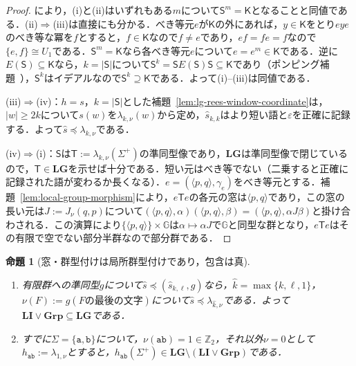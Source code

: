 \documentclass[11pt,a4paper]{ltjsarticle}
\numberwithin{equation}{section}
\theoremstyle{plain}
\newtheorem{proposition}[theorem]{命題}
\theoremstyle{definition}
\theoremstyle{remark}
\newcommand{\eps}{\varepsilon}
\begin{document}
\begin{proof}
\cite[Proposition~2.3, items (1), (3) and (4)]{AlmeidaEtAl2009}により，(i)と(ii)はいずれもある$m$について$\mathsf S^m=\mathsf K$となることと同値である．(ii)$\Rightarrow$(iii)は直接にも分かる．べき等元$e$が$\mathsf K$の外にあれば，$y\in\mathsf K$をとり$eye$のべき等な冪を$f$とすると，$f\in\mathsf K$なので$f\ne e$であり，$ef=fe=f$なので$\{e,f\}\cong U_1$である．$\mathsf S^m=\mathsf K$なら各べき等元$e$について$e=e^m\in\mathsf K$である．逆に$E(\mathsf S)\subseteq\mathsf K$なら，$k=|\mathsf S|$について$\mathsf S^k=\mathsf S E(\mathsf S)\mathsf S\subseteq\mathsf K$であり（ポンピング補題~\cite[Lemma~2.2]{AlmeidaEtAl2009}），$\mathsf S^k$はイデアルなので$\mathsf S^k\supseteq\mathsf K$である．よって(i)--(iii)は同値である．

(iii)$\Rightarrow$(iv)：$h=s$，$k=|\mathsf S|$とした補題~\ref{lem:lg-rees-window-coordinate}は，$|w|\ge2k$について$s(w)$を$\lambda_{k,\nu}(w)$から定め，$\widehat s_{k,k}$はより短い語と$\eps$を正確に記録する．よって$\widehat s\preceq\lambda_{k,\nu}$である．

(iv)$\Rightarrow$(i)：$\mathsf S$は$\mathsf T:=\lambda_{k,\nu}(\Sigma^+)$の準同型像であり，$\mathbf{LG}$は準同型像で閉じているので，$\mathsf T\in\mathbf{LG}$を示せば十分である．短い元はべき等でない（二乗すると正確に記録された語が変わるか長くなる）．$e=(\langle p,q\rangle,\gamma_e)$をべき等元とする．補題~\ref{lem:local-group-morphism}により，$e\mathsf Te$の各元の窓は$\langle p,q\rangle$であり，この窓の長い元は$J:=J_\nu(q,p)$について$(\langle p,q\rangle,\alpha)(\langle p,q\rangle,\beta)=(\langle p,q\rangle,\alpha J\beta)$と掛け合わされる．この演算により$\{\langle p,q\rangle\}\times {\mathbb G}$は$\alpha\mapsto\alpha J$で${\mathbb G}$と同型な群となり，$e\mathsf Te$はその有限で空でない部分半群なので部分群である．
\end{proof}

\begin{proposition}[窓・群型付けは局所群型付けであり，包含は真]
\label{prop:li-g-strict}
\begin{enumerate}[label=\textup{(\roman*)},leftmargin=*]
\item 有限群への準同型$g$について$\widehat s\preceq(\widehat s_{k,\ell},g)$なら，$\hat k=\max\{k,\ell,1\}$，$\nu(F):=g(F\text{の最後の文字})$について$\widehat s\preceq\lambda_{\hat k,\nu}$である．よって$\mathbf{LI}\vee\mathbf{Grp}\subseteq\mathbf{LG}$である．
\item すでに$\Sigma=\{\mathtt a,\mathtt b\}$について，$\nu(\mathtt{ab})=1\in\mathbb Z_2$，それ以外$\nu=0$として$h_{\mathtt{ab}}:=\lambda_{1,\nu}$とすると，$h_{\mathtt{ab}}(\Sigma^+)\in\mathbf{LG}\setminus(\mathbf{LI}\vee\mathbf{Grp})$である．
\end{enumerate}
\end{proposition}
\end{document}
